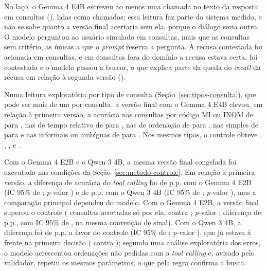 No laço, o Gemma 4 E4B escreveu ao menos uma chamada no texto da resposta em  consultas (), lidas como chamadas; essa leitura faz parte do sistema medido, e não se sabe quanto a versão final acertaria sem ela, porque o diálogo seria outro. O modelo perguntou ao usuário simulado em  consultas, mais que as  consultas sem critério, as únicas a que o \textit{prompt} reserva a pergunta. A recusa contestada foi acionada em  consultas, e em  consultas fora do domínio a recusa estava certa, foi contestada e o modelo passou a buscar, o que explica parte da queda do \textit{recall} da recusa em relação à segunda versão ().

Numa leitura exploratória por tipo de consulta (Seção~\ref{sec:tipos-consulta}), que pode ser mais de um por consulta, a versão final com o Gemma 4 E4B elevou, em relação à primeira versão, a acurácia nas consultas por código MI ou INOM de  para , nas de tempo relativo de  para , nas de ordenação de  para , nas simples de  para  e nas informais ou ambíguas de  para . Nos mesmos tipos, o controle obteve , , ,  e .

Com o Gemma 4 E2B e o Qwen 3 4B, a mesma versão final congelada foi executada nas condições da Seção~\ref{sec:metodo-controle}. Em relação à primeira versão, a diferença de acurácia do \textit{tool calling} foi de  p.p. com o Gemma 4 E2B (IC 95\% de ; \textit{p}-valor ) e de  p.p. com o Qwen 3 4B (IC 95\% de ; \textit{p}-valor ), mas a comparação principal dependeu do modelo. Com o Gemma 4 E2B, a versão final superou o controle ( consultas acertadas só por ela, contra ; \textit{p}-valor ; diferença de  p.p., com IC 95\% de , na mesma convenção de sinal). Com o Qwen 3 4B, a diferença foi de  p.p. a favor do controle (IC 95\% de ; \textit{p}-valor ), que já estava à frente na primeira decisão ( contra ); segundo uma análise exploratória dos erros, o modelo acrescentou ordenações não pedidas com o \textit{tool calling} e, avisado pelo validador, repetiu os mesmos parâmetros, o que pela regra confirma a busca.


